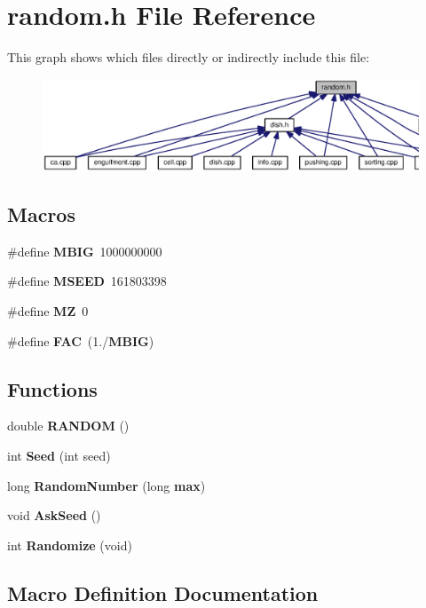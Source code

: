 \section{random.\-h File Reference}
\label{random_8h}
This graph shows which files directly or indirectly include this file\-:
\nopagebreak
\begin{figure}[H]
\begin{center}
\leavevmode
\includegraphics[width=350pt]{random_8h__dep__incl}
\end{center}
\end{figure}
\subsection*{Macros}
\begin{DoxyCompactItemize}
\item 
\#define {\bf M\-B\-I\-G}~1000000000
\item 
\#define {\bf M\-S\-E\-E\-D}~161803398
\item 
\#define {\bf M\-Z}~0
\item 
\#define {\bf F\-A\-C}~(1./{\bf M\-B\-I\-G})
\end{DoxyCompactItemize}
\subsection*{Functions}
\begin{DoxyCompactItemize}
\item 
double {\bf R\-A\-N\-D\-O\-M} ()
\item 
int {\bf Seed} (int seed)
\item 
long {\bf Random\-Number} (long {\bf max})
\item 
void {\bf Ask\-Seed} ()
\item 
int {\bf Randomize} (void)
\end{DoxyCompactItemize}


\subsection{Macro Definition Documentation}
